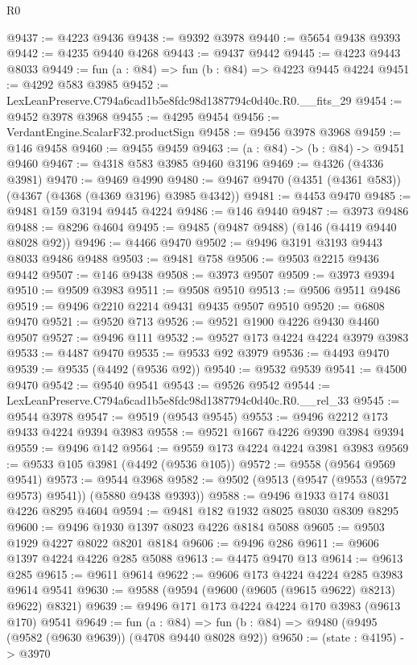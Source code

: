 \begin{lexlean}{R0}
\begin{coremodule}
@9437 := @4223 @9436
@9438 := @9392 @3978
@9440 := @5654 @9438 @9393
@9442 := @4235 @9440 @4268
@9443 := @9437 @9442
@9445 := @4223 @9443 @8033
@9449 := fun (a : @84) => fun (b : @84) => @4223 @9445 @4224
@9451 := @4292 @583 @3985
@9452 := LexLeanPreserve.C794a6cad1b5e8fdc98d1387794c0d40c.R0.__fits_29
@9454 := @9452 @3978 @3968
@9455 := @4295 @9454
@9456 := VerdantEngine.ScalarF32.productSign
@9458 := @9456 @3978 @3968
@9459 := @146 @9458
@9460 := @9455 @9459
@9463 := (a : @84) -> (b : @84) -> @9451 @9460
@9467 := @4318 @583 @3985 @9460 @3196
@9469 := @4326 (@4336 @3981)
@9470 := @9469 @4990
@9480 := @9467 @9470 (@4351 (@4361 @583)) (@4367 (@4368 (@4369 @3196) @3985 @4342))
@9481 := @4453 @9470
@9485 := @9481 @159 @3194 @9445 @4224
@9486 := @146 @9440
@9487 := @3973 @9486
@9488 := @8296 @4604
@9495 := @9485 (@9487 @9488) (@146 (@4419 @9440 @8028 @92))
@9496 := @4466 @9470
@9502 := @9496 @3191 @3193 @9443 @8033 @9486 @9488
@9503 := @9481 @758
@9506 := @9503 @2215 @9436 @9442
@9507 := @146 @9438
@9508 := @3973 @9507
@9509 := @3973 @9394
@9510 := @9509 @3983
@9511 := @9508 @9510
@9513 := @9506 @9511 @9486
@9519 := @9496 @2210 @2214 @9431 @9435 @9507 @9510
@9520 := @6808 @9470
@9521 := @9520 @713
@9526 := @9521 @1900 @4226 @9430 @4460 @9507
@9527 := @9496 @111
@9532 := @9527 @173 @4224 @4224 @3979 @3983
@9533 := @4487 @9470
@9535 := @9533 @92 @3979
@9536 := @4493 @9470
@9539 := @9535 (@4492 (@9536 @92))
@9540 := @9532 @9539
@9541 := @4500 @9470
@9542 := @9540 @9541
@9543 := @9526 @9542
@9544 := LexLeanPreserve.C794a6cad1b5e8fdc98d1387794c0d40c.R0.__rel_33
@9545 := @9544 @3978
@9547 := @9519 (@9543 @9545)
@9553 := @9496 @2212 @173 @9433 @4224 @9394 @3983
@9558 := @9521 @1667 @4226 @9390 @3984 @9394
@9559 := @9496 @142
@9564 := @9559 @173 @4224 @4224 @3981 @3983
@9569 := @9533 @105 @3981 (@4492 (@9536 @105))
@9572 := @9558 (@9564 @9569 @9541)
@9573 := @9544 @3968
@9582 := @9502 (@9513 (@9547 (@9553 (@9572 @9573) @9541)) (@5880 @9438 @9393))
@9588 := @9496 @1933 @174 @8031 @4226 @8295 @4604
@9594 := @9481 @182 @1932 @8025 @8030 @8309 @8295
@9600 := @9496 @1930 @1397 @8023 @4226 @8184 @5088
@9605 := @9503 @1929 @4227 @8022 @8201 @8184
@9606 := @9496 @286
@9611 := @9606 @1397 @4224 @4226 @285 @5088
@9613 := @4475 @9470 @13
@9614 := @9613 @285
@9615 := @9611 @9614
@9622 := @9606 @173 @4224 @4224 @285 @3983 @9614 @9541
@9630 := @9588 (@9594 (@9600 (@9605 (@9615 @9622) @8213) @9622) @8321)
@9639 := @9496 @171 @173 @4224 @4224 @170 @3983 (@9613 @170) @9541
@9649 := fun (a : @84) =>
  fun (b : @84) => @9480 (@9495 (@9582 (@9630 @9639)) (@4708 @9440 @8028 @92))
@9650 := (state : @4195) -> @3970

\end{coremodule}
\end{lexlean}
